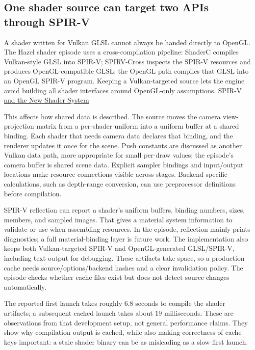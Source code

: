 \subsection{One shader source can target two APIs through SPIR-V}\label{06-engine-ii-ch026-one-shader-source-can-target-two-apis-through-spir-v}

A shader written for Vulkan GLSL cannot always be handed directly to OpenGL. The Hazel shader episode uses a cross-compilation pipeline: ShaderC compiles Vulkan-style GLSL into SPIR-V; SPIRV-Cross inspects the SPIR-V resources and produces OpenGL-compatible GLSL; the OpenGL path compiles that GLSL into an OpenGL SPIR-V program. Keeping a Vulkan-targeted source lets the engine avoid building all shader interfaces around OpenGL-only assumptions. \href{https://www.youtube.com/watch?v=SXDlZRDjtXg}{SPIR-V and the New Shader System}

This affects how shared data is described. The source moves the camera view-projection matrix from a per-shader uniform into a uniform buffer at a shared binding. Each shader that needs camera data declares that binding, and the renderer updates it once for the scene. Push constants are discussed as another Vulkan data path, more appropriate for small per-draw values; the episode's camera buffer is shared scene data. Explicit sampler bindings and input/output locations make resource connections visible across stages. Backend-specific calculations, such as depth-range conversion, can use preprocessor definitions before compilation.

SPIR-V reflection can report a shader's uniform buffers, binding numbers, sizes, members, and sampled images. That gives a material system information to validate or use when assembling resources. In the episode, reflection mainly prints diagnostics; a full material-binding layer is future work. The implementation also keeps both Vulkan-targeted SPIR-V and OpenGL-generated GLSL/SPIR-V, including text output for debugging. These artifacts take space, so a production cache needs source/options/backend hashes and a clear invalidation policy. The episode checks whether cache files exist but does not detect source changes automatically.

The reported first launch takes roughly 6.8 seconds to compile the shader artifacts; a subsequent cached launch takes about 19 milliseconds. These are observations from that development setup, not general performance claims. They show why compilation output is cached, while also making correctness of cache keys important: a stale shader binary can be as misleading as a slow first launch.


